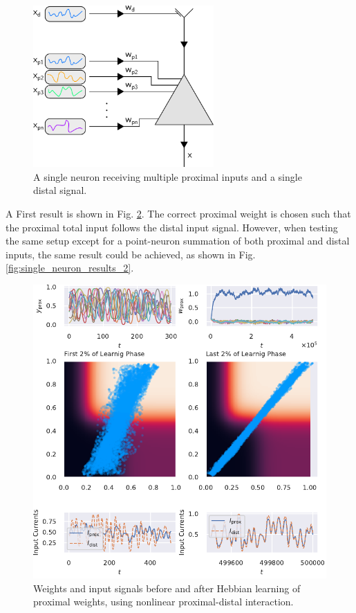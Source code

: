 \documentclass[10pt,a4paper]{article}
\begin{document}
\begin{figure}
\centering
\includegraphics[width=6.91cm]{./figures/single_neuron_illustration.png}
\caption{A single neuron receiving multiple proximal inputs and a single distal signal.}
\label{fig:single_neuron_illustration}
\end{figure}

A First result is shown in Fig. \ref{fig:single_neuron_results_1}. The correct proximal weight is chosen such that the proximal total input follows the distal input signal. However, when testing the same setup except for a point-neuron summation of both proximal and distal inputs, the same result could be achieved, as shown in Fig. \ref{fig:single_neuron_results_2}. 

\begin{figure}
\centering
\includegraphics[width=\textwidth]{./figures/fig1.pdf}
\caption{Weights and input signals before and after Hebbian learning of proximal weights, using nonlinear proximal-distal interaction.}
\label{fig:single_neuron_results_1}
\end{figure}
\end{document}
